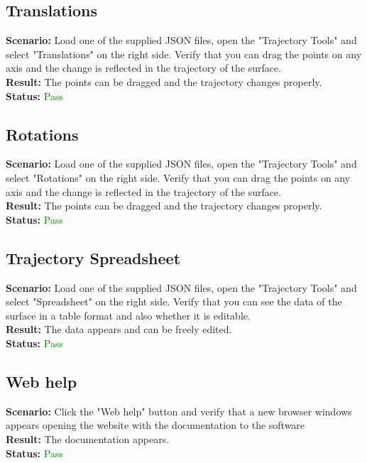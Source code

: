 \documentclass[a4paper, 11pt, article]{report}
\begin{document}
\subsection{Translations}

\noindent \textbf{Scenario:} Load one of the supplied JSON files, open the "Trajectory Tools" and select "Translations" on the right side. Verify that you can drag the points on any axis and the change is reflected in the trajectory of the surface.
\\
\noindent \textbf{Result:} The points can be dragged and the trajectory changes properly.
\\
\noindent \textbf{Status:} \textcolor{green}{Pass}

\subsection{Rotations}

\noindent \textbf{Scenario:} Load one of the supplied JSON files, open the "Trajectory Tools" and select "Rotations" on the right side. Verify that you can drag the points on any axis and the change is reflected in the trajectory of the surface.
\\
\noindent \textbf{Result:} The points can be dragged and the trajectory changes properly.
\\
\noindent \textbf{Status:} \textcolor{green}{Pass}

\subsection{Trajectory Spreadsheet}

\noindent \textbf{Scenario:} Load one of the supplied JSON files, open the "Trajectory Tools" and select "Spreadsheet" on the right side. Verify that you can see the data of the surface in a table format and also whether it is editable.
\\
\noindent \textbf{Result:} The data appears and can be freely edited.
\\
\noindent \textbf{Status:} \textcolor{green}{Pass}

\subsection{Web help}

\noindent \textbf{Scenario:} Click the "Web help" button and verify that a new browser windows appears opening the website with the documentation to the software
\\
\noindent \textbf{Result:} The documentation appears.
\\
\noindent \textbf{Status:} \textcolor{green}{Pass}
\end{document}
